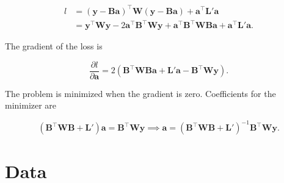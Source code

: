 \documentclass[a4paper]{artikel3}
\numberwithin{equation}{section}
\numberwithin{theorem}{section}
\numberwithin{proposition}{section}
\numberwithin{lemma}{section}
\begin{document}
\begin{equation*}
    \begin{aligned}
        l &= (\mathbf{y} - \mathbf{B} \mathbf{a})^\top \mathbf{W} (\mathbf{y} - \mathbf{B} \mathbf{a}) + \mathbf{a}^\top \mathbf{L}' \mathbf{a} \\
          &= \mathbf{y}^\top \mathbf{W} \mathbf{y} - 2\mathbf{a}^\top \mathbf{B}^\top \mathbf{W} \mathbf{y} + \mathbf{a}^\top \mathbf{B}^\top \mathbf{W} \mathbf{B}\mathbf{a} + \mathbf{a}^\top \mathbf{L}' \mathbf{a} .
    \end{aligned}
\end{equation*}

The gradient of the loss is 

\begin{equation*}
    \frac{\partial l}{\partial \mathbf{a}} = 2(\mathbf{B}^\top \mathbf{W} \mathbf{B}\mathbf{a} + \mathbf{L}' \mathbf{a} - \mathbf{B}^\top \mathbf{W} \mathbf{y}) .
\end{equation*}

The problem is minimized when the gradient is zero. Coefficients for the minimizer are 

\begin{equation*}
    (\mathbf{B}^\top \mathbf{W} \mathbf{B} + \mathbf{L}') \mathbf{a} = \mathbf{B}^\top \mathbf{W} \mathbf{y} \implies \mathbf{a} = (\mathbf{B}^\top \mathbf{W} \mathbf{B} + \mathbf{L}')^{-1}\mathbf{B}^\top \mathbf{W} \mathbf{y} .
\end{equation*}


\clearpage


\section{Data}
\label{app:data}
\end{document}
